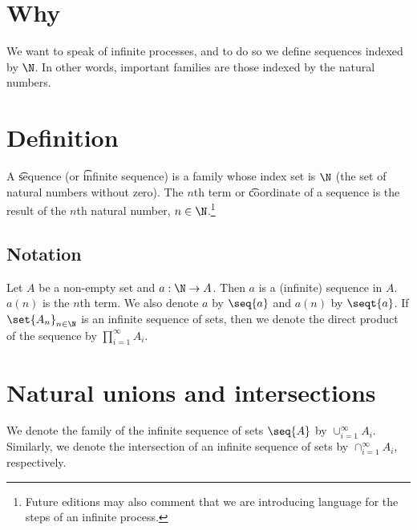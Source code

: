 
\section*{Why}

We want to speak of infinite processes, and to do so we define sequences indexed by $\N  $.
In other words, important families are those indexed by the natural numbers.

\section*{Definition}

A \t{sequence} (or \t{infinite sequence}) is a family whose index set is $\N  $ (the set of natural numbers without zero).
The \t{$n$th term} or \t{coordinate} of a sequence is the result of the $n$th natural number, $n \in \N  $.\footnote{Future editions may also comment that we are introducing language for the steps of an infinite process.}

\subsection*{Notation}

Let $A$ be a non-empty set and $a: \N   \to A$.
Then $a$ is a (infinite) sequence in $A$.
$a(n)$ is the $n$th term.
We also denote $a$ by $\seq{a}$ and $a(n)$ by $\seqt{a}$.
If $\set{A_n}_{n \in \N  }$ is an infinite sequence of sets, then we denote the direct product of the sequence by $\prod_{i = 1}^{\infty} A_i$.

\section*{Natural unions and intersections}

We denote the family of the infinite sequence of sets $\seq{A}$ by $\cup_{i = 1}^{\infty} A_i$.
Similarly, we denote the intersection of an infinite sequence of sets by $\cap _{i = 1}^{\infty} A_i$, respectively.

\blankpage